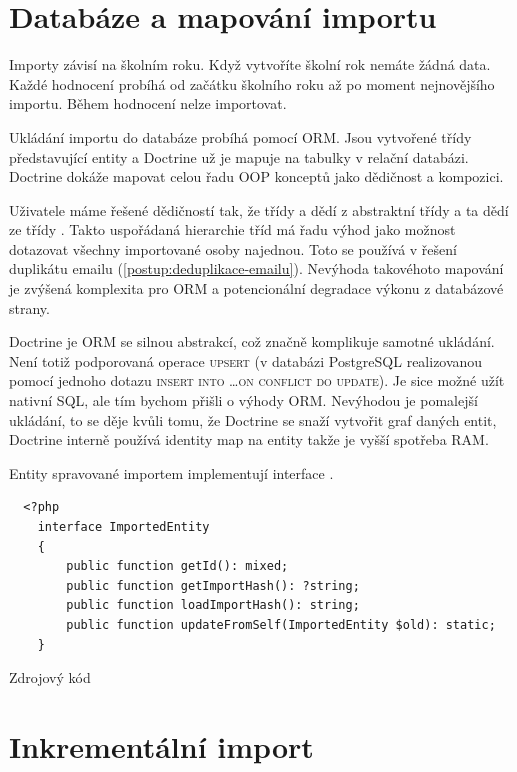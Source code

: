 \section{Databáze a mapování importu}

Importy závisí na školním roku.
Když vytvoříte školní rok nemáte žádná data.
Každé hodnocení probíhá od začátku školního roku až po moment nejnovějšího importu.
Během hodnocení nelze importovat.

Ukládání importu do databáze probíhá pomocí ORM.
Jsou vytvořené třídy představující entity a Doctrine už je mapuje na tabulky v relační databázi.
Doctrine dokáže mapovat celou řadu OOP konceptů jako dědičnost a kompozici.

Uživatele máme řešené dědičností tak, že třídy  a  dědí z abstraktní třídy  a ta dědí ze třídy .
Takto uspořádaná hierarchie tříd má řadu výhod jako možnost dotazovat všechny importované osoby najednou.
Toto se používá v řešení duplikátu emailu (\ref{postup:deduplikace-emailu}).
Nevýhoda takovéhoto mapování je zvýšená komplexita pro ORM a potencionální degradace výkonu z databázové strany.

Doctrine je ORM se silnou abstrakcí, což značně komplikuje samotné ukládání.
Není totiž podporovaná operace \textsc{upsert} (v databázi PostgreSQL realizovanou pomocí jednoho dotazu \textsc{insert into \dots  on conflict do update}).
Je sice možné užít nativní SQL, ale tím bychom přišli o výhody ORM.
Nevýhodou je pomalejší ukládání, to se děje kvůli tomu, že Doctrine se snaží vytvořit graf daných entit, Doctrine interně používá identity map na entity takže je vyšší spotřeba RAM.

Entity spravované importem implementují interface .

\begin{code}[H]
\begin{verbatim}
  <?php
    interface ImportedEntity
    {
        public function getId(): mixed;
        public function getImportHash(): ?string;   
        public function loadImportHash(): string;   
        public function updateFromSelf(ImportedEntity $old): static;
    }
\end{verbatim}
\caption{Zdrojový kód }
\label{postup:imported-entity}
\end{code}


\section{Inkrementální import}

